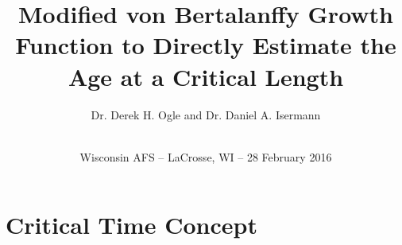 \documentclass[xcolor=dvipsnames]{beamer}\usepackage[]{graphicx}\usepackage[]{color}
\begin{document}
\title[Critical Time from Modified VBGF]{Modified von Bertalanffy Growth Function to Directly Estimate the Age at a Critical Length}
\author[Ogle \& Isermann]{Dr. Derek H. Ogle  and Dr. Daniel A. Isermann }
\date[WI AFS 2016]{ \\[2\baselineskip] Wisconsin AFS -- LaCrosse, WI -- 28 February 2016}
\maketitle

\AtBeginSection[] {
\begin{frame}[t]
\frametitle{}
\tableofcontents[currentsection]
\end{frame}
}



\section{Critical Time Concept}
\end{document}
